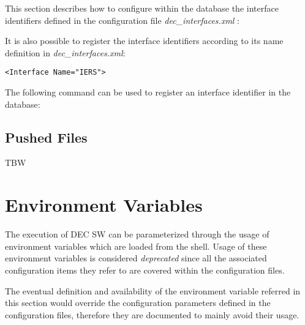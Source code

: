 \documentclass[dec_sum_main.tex]{subfiles}
\begin{document}
This section describes how to configure within the database the interface identifiers defined in the configuration file \textit{dec\_interfaces.xml} :

 \newline

\par

\noindent
It is also possible to register the interface identifiers according to its name definition in \textit{dec\_interfaces.xml}: \begin{verbatim}<Interface Name="IERS">\end{verbatim} 

\par 
\noindent
\noindent
The following command can be used to register an interface identifier in the database:

 \newline





\subsection{Pushed Files}
TBW


\section{Environment Variables}

The execution of DEC SW can be parameterized through the usage of environment variables which are loaded from the shell. Usage of these environment variables is considered \textit{deprecated} since all the associated configuration items they refer to are covered within the configuration files.
\newline
\par
\noindent
The eventual definition and availability of the environment variable referred in this section would override the configuration parameters defined in the configuration files, therefore they are documented to mainly avoid their usage.
\end{document}
